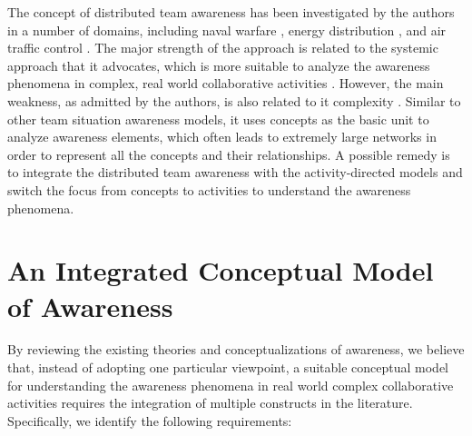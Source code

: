 The concept of distributed team awareness has been investigated by the authors in a number of domains, including naval warfare \cite{Stanton2006}, energy distribution \cite{Salmon2008a}, and air traffic control \cite{Stanton2009}. The major strength of the approach is related to the systemic approach that it advocates, which is more suitable to analyze the awareness phenomena in complex, real world collaborative activities \cite{Stanton2009}. However, the main weakness, as admitted by the authors, is also related to it complexity \cite{Salmon2010}. Similar to other team situation awareness models, it uses concepts as the basic unit to analyze awareness elements, which often leads to extremely large networks in order to represent all the concepts and their relationships. A possible remedy is to integrate the distributed team awareness with the activity-directed models and switch the focus from concepts to activities to understand the awareness phenomena.


\section{An Integrated Conceptual Model of Awareness} %
\label{sec:integrated_conceptual_model_of_awareness}
By reviewing the existing theories and conceptualizations of awareness, we believe that, instead of adopting one particular viewpoint, a suitable conceptual model for understanding the awareness phenomena in real world complex collaborative activities requires the integration of multiple constructs in the literature. Specifically, we identify the following requirements:

